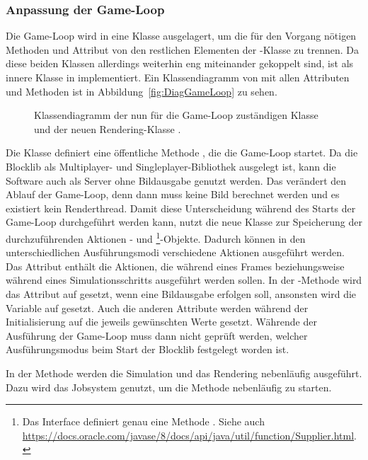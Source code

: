 \subsubsection{Anpassung der Game-Loop}\label{sec:adjustGameLoop}
Die Game-Loop wird in eine Klasse  ausgelagert, um die für den Vorgang nötigen Methoden und Attribut von den restlichen Elementen der -Klasse zu trennen. Da diese beiden Klassen allerdings weiterhin eng miteinander gekoppelt sind, ist  als innere Klasse in  implementiert. Ein Klassendiagramm von   mit allen Attributen und Methoden ist in Abbildung~\vref{fig:DiagGameLoop} zu sehen.
\begin{figure}[htbp]
	\centering
	
	\caption{Klassendiagramm der nun für die Game-Loop zuständigen Klasse  und der neuen Rendering-Klasse .}\label{fig:DiagGameLoop}
\end{figure}
Die Klasse definiert eine öffentliche Methode , die die Game-Loop startet. Da die Blocklib als Multiplayer- und Singleplayer-Bibliothek ausgelegt ist, kann die Software auch als Server ohne Bildausgabe genutzt werden. Das verändert den Ablauf der Game-Loop, denn dann muss keine Bild berechnet werden und es existiert kein Renderthread. Damit diese Unterscheidung während des Starts der Game-Loop durchgeführt werden kann, nutzt die neue Klasse  zur Speicherung der durchzuführenden Aktionen - und \footnote{Das Interface  definiert genau eine Methode . Siehe auch \url{https://docs.oracle.com/javase/8/docs/api/java/util/function/Supplier.html}.}-Objekte. Dadurch können in den unterschiedlichen Ausführungsmodi verschiedene Aktionen ausgeführt werden. Das Attribut  enthält die Aktionen, die während eines Frames beziehungsweise während eines Simulationsschritts ausgeführt werden sollen. In der -Methode wird das Attribut auf  gesetzt, wenn eine Bildausgabe erfolgen soll, ansonsten wird die Variable auf  gesetzt. Auch die anderen Attribute werden während der Initialisierung auf die jeweils gewünschten Werte gesetzt. Währende der Ausführung der Game-Loop muss dann nicht geprüft werden, welcher Ausführungsmodus beim Start der Blocklib festgelegt worden ist.

In der Methode  werden die Simulation und das Rendering nebenläufig ausgeführt. Dazu wird das Jobsystem genutzt, um die Methode  nebenläufig zu starten. 

